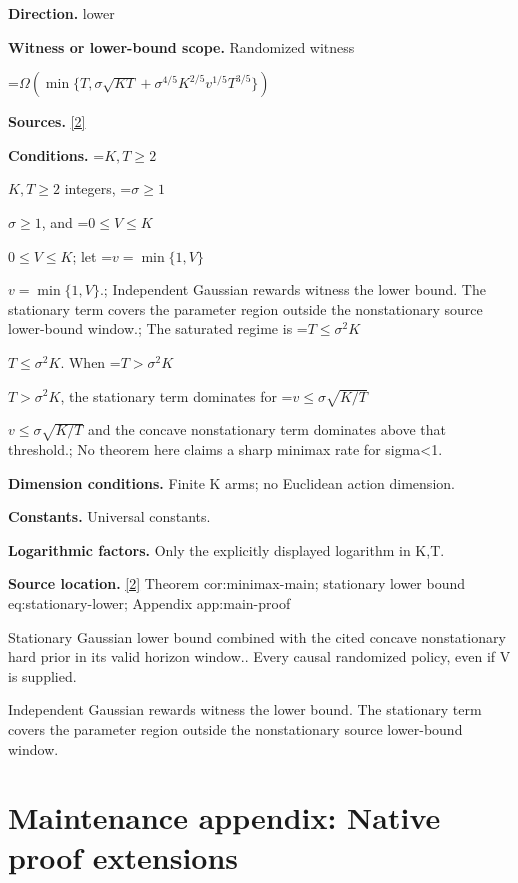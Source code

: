 \documentclass[10pt,a4paper]{article}
\newcommand{\AtlasMath}[1]{\par\begingroup\centering\setbox0=\hbox{$\displaystyle #1$}\ifdim\wd0>1.4\linewidth\typeout{ATLAS WIDE FORMULA: \the\wd0}\fi\ifdim\wd0>\linewidth\resizebox{\linewidth}{!}{\box0}\else\box0\fi\par\endgroup}
\newcommand{\AtlasInlineMath}[1]{\begingroup\setbox0=\hbox{$#1$}\ifdim\wd0>.4\linewidth\endgroup\AtlasMath{#1}\else\endgroup$#1$\fi}
\begin{document}
\textbf{Direction.} lower



\textbf{Witness or lower-bound scope.} Randomized witness



\AtlasMath{\Omega\!\left(\min\{T,\sigma\sqrt{KT}+\sigma^{4/5}K^{2/5}v^{1/5}T^{3/5}\}\right)}


\textbf{Sources.} \href{https://github.com/WU-Wendao/Colombo/blob/main/colombo_sensorium/Complexity_altas/data/sources/colombo/U12/manuscript.pdf}{[2]}



\textbf{Conditions.} \AtlasInlineMath{K,T\ge2} integers, \AtlasInlineMath{\sigma\ge1}, and \AtlasInlineMath{0\le V\le K}; let \AtlasInlineMath{v=\min\{1,V\}}.; Independent Gaussian rewards witness the lower bound. The stationary term covers the parameter region outside the nonstationary source lower-bound window.; The saturated regime is \AtlasInlineMath{T\le\sigma^2K}. When \AtlasInlineMath{T>\sigma^2K}, the stationary term dominates for \AtlasInlineMath{v\le\sigma\sqrt{K/T}} and the concave nonstationary term dominates above that threshold.; No theorem here claims a sharp minimax rate for sigma<1.



\textbf{Dimension conditions.} Finite K arms; no Euclidean action dimension.



\textbf{Constants.} Universal constants.



\textbf{Logarithmic factors.} Only the explicitly displayed logarithm in K,T.



\textbf{Source location.} \href{https://github.com/WU-Wendao/Colombo/blob/main/colombo_sensorium/Complexity_altas/data/sources/colombo/U12/manuscript.pdf}{[2]} Theorem cor:minimax-main; stationary lower bound eq:stationary-lower; Appendix app:main-proof



Stationary Gaussian lower bound combined with the cited concave nonstationary hard prior in its valid horizon window.. Every causal randomized policy, even if V is supplied.



Independent Gaussian rewards witness the lower bound. The stationary term covers the parameter region outside the nonstationary source lower-bound window.



\section{Maintenance appendix: Native proof extensions}
\end{document}
